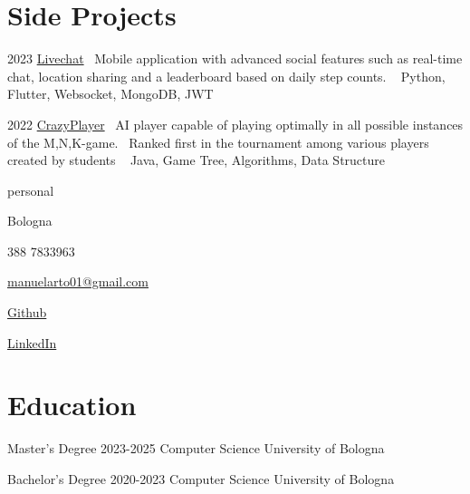 \documentclass{tccv}
\begin{document}
\section{Side Projects}

\begin{yearlist}

\item{2023}
     {\href{https://github.com/manuelarto/livechat}{Livechat}}
     {\textbullet~Mobile application with advanced social features such as real-time chat, location sharing and a leaderboard based on daily step counts. \newline
    \textbullet~ Python, Flutter, Websocket, MongoDB, JWT}
\item{2022}
     {\href{https://github.com/manuelarto/crazyplayer}{CrazyPlayer}}
     {\textbullet~AI player capable of playing optimally in all possible instances of the M,N,K-game. \newline
     \textbullet~Ranked first in the tournament among various players created by students \newline
    \textbullet~ Java, Game Tree, Algorithms, Data Structure}

\end{yearlist}


\newpage


\begin{keyvaluelist}{personal}
    \item[\faHome] Bologna
    \item[\faPhone] 388 7833963
    \item[\faEnvelope] \href{mailto:manuelarto01@gmail.com}{manuelarto01@gmail.com}
    \item[\faGithub] \href{https://github.com/manuelarto}{Github}
    \item[\faLinkedin] \href{https://www.linkedin.com/in/manuel-arto-696012203/}{LinkedIn}
\end{keyvaluelist}


\section{Education}

\begin{yearlist}

\item[Master's Degree]{2023-2025}
     {Computer Science}
     {University of Bologna}

\item[Bachelor's Degree]{2020-2023}
    {Computer Science}
    {University of Bologna}

\end{yearlist}
\end{document}
